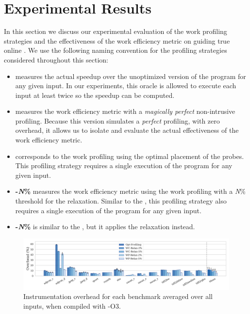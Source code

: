 \section{Experimental Results}\label{sec:results}

In this section we discuss our experimental evaluation of the work profiling strategies and 
the effectiveness of the work efficiency metric on guiding true online {\itercomp}.
We use the following naming convention for the profiling strategies considered
throughout this section:
\begin{itemize}[leftmargin=3mm]
\item \textbf{\OracleRM} measures the actual speedup over the unoptimized version of the program for any given input.
In our experiments, this oracle is allowed to execute each input at least twice so the speedup can be computed.
\item \textbf{\OraclePP} measures the work efficiency metric with a \textit{magically perfect} non-intrusive profiling.
  Because this version simulates a \textit{perfect} profiling, with zero overhead,
  it allows us to isolate and evaluate the actual effectiveness of the work efficiency metric.
\item \textbf{\OptProf} corresponds to the work profiling using the optimal placement of the probes.
  This profiling strategy requires a single execution of the program for any given input.
\item \textbf{\WCRelax-\textit{N}\%} measures the work efficiency metric using the work profiling with a \textit{N}\% threshold for
the \WCRelaxLower relaxation.
  Similar to the \OptProf, this profiling strategy also requires a single execution of the program for any given input.
\item \textbf{\WPRelax-\textit{N}\%} is similar to the \WCRelax, but it applies the \WPRelaxLower relaxation instead.
\end{itemize}

\begin{figure}[t!]
    \centering
    \includegraphics[width=\textwidth]{figs/overhead-O3.pdf}
    \caption{Instrumentation overhead for each benchmark averaged over all inputs, when compiled with {\flagstype -O3}.}
    \vspace{-3mm}
    \label{fig:overhead-O3}
\end{figure}

